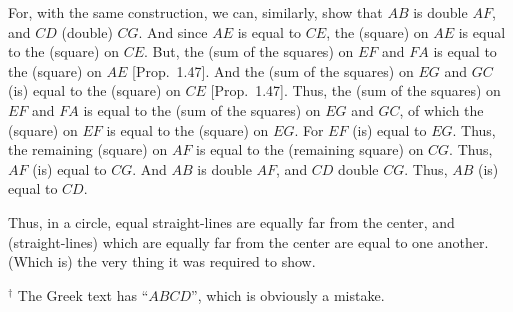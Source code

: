 \begin{Parallel}{}{}
{For, with the same construction,  we can, similarly, show that
$AB$ is double $AF$, and $CD$ (double) $CG$. And since $AE$ is equal to $CE$, the (square) on $AE$ is equal to the (square) on $CE$. But, the (sum of the squares)
on $EF$ and $FA$ is equal to the (square) on $AE$ [Prop.~1.47]. And the (sum of
the squares) on $EG$ and $GC$ (is) equal to the (square) on $CE$ [Prop.~1.47]. Thus, the (sum of the squares) on $EF$ and $FA$ is equal to the (sum of the squares) on $EG$ and $GC$, of which the (square) on $EF$ is equal to the (square)
on $EG$. For $EF$ (is) equal to $EG$. Thus, the remaining (square) on  $AF$ is equal to the (remaining square) on  $CG$. Thus, $AF$ (is) equal to $CG$. And $AB$ is double $AF$, and
$CD$ double $CG$. Thus, $AB$ (is) equal to $CD$.

Thus, in a circle, equal straight-lines are equally far from the center, and
(straight-lines) which are equally far from the center are equal to one another.
(Which is) the very thing it was required to show.}
\end{Parallel}
{\footnotesize \noindent$^\dag$ The Greek text has ``$ABCD$'', which is obviously a
mistake.}

